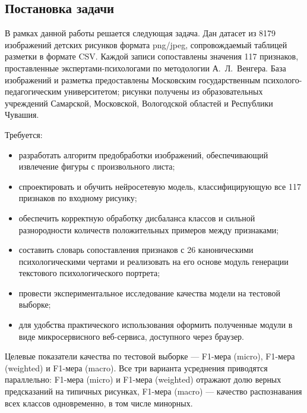 \subsection{Постановка задачи}

В рамках данной работы решается следующая задача. Дан датасет из 8179 изображений детских рисунков формата png/jpeg, сопровождаемый таблицей разметки в формате CSV. Каждой записи сопоставлены значения 117 признаков, проставленные экспертами-психологами по методологии А.~Л.~Венгера. База изображений и разметка предоставлены Московским государственным психолого-педагогическим университетом; рисунки получены из образовательных учреждений Самарской, Московской, Вологодской областей и Республики Чувашия.

Требуется:

\begin{itemize}
    \item разработать алгоритм предобработки изображений, обеспечивающий извлечение фигуры с произвольного листа;
    \item спроектировать и обучить нейросетевую модель, классифицирующую все 117 признаков по входному рисунку;
    \item обеспечить корректную обработку дисбаланса классов и сильной разнородности количеств положительных примеров между признаками;
    \item составить словарь сопоставления признаков с 26 каноническими психологическими чертами и реализовать на его основе модуль генерации текстового психологического портрета;
    \item провести экспериментальное исследование качества модели на тестовой выборке;
    \item для удобства практического использования оформить полученные модули в виде микросервисного веб-сервиса, доступного через браузер.
\end{itemize}

Целевые показатели качества по тестовой выборке --- F1-мера (micro), F1-мера (weighted) и F1-мера (macro). Все три варианта усреднения приводятся параллельно: F1-мера (micro) и F1-мера (weighted) отражают долю верных предсказаний на типичных рисунках, F1-мера (macro) --- качество распознавания всех классов одновременно, в том числе минорных.
